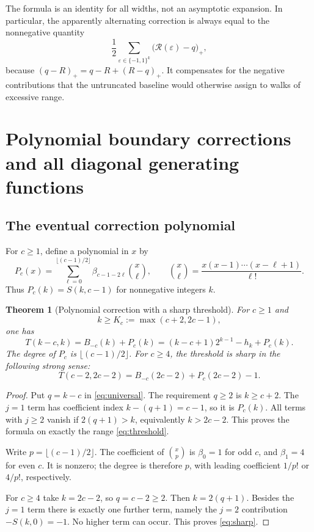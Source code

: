 \documentclass[11pt,letterpaper]{article}
\numberwithin{equation}{section}
\newtheorem{theorem}{Theorem}[section]
\theoremstyle{definition}
\begin{document}
The formula is an identity for all widths, not an asymptotic expansion.
In particular, the apparently alternating correction is always equal
to the nonnegative quantity
\begin{equation}\label{eq:overflow}
\frac12\sum_{\varepsilon\in\{-1,1\}^k}
\bigl(\mathcal R(\varepsilon)-q\bigr)_+,
\end{equation}
because $(q-R)_+=q-R+(R-q)_+$.  It compensates for the negative
contributions that the untruncated baseline would otherwise assign to
walks of excessive range.

\section{Polynomial boundary corrections and all diagonal generating functions}
\label{sec:diagonals}

\subsection{The eventual correction polynomial}
For $c\ge1$, define a polynomial in $x$ by
\begin{equation}\label{eq:Pc}
P_c(x)=\sum_{\ell=0}^{\lfloor(c-1)/2\rfloor}
\beta_{c-1-2\ell}\binom{x}{\ell},
\qquad
\binom{x}{\ell}=\frac{x(x-1)\cdots(x-\ell+1)}{\ell!}.
\end{equation}
Thus $P_c(k)=S(k,c-1)$ for nonnegative integers $k$.

\begin{theorem}[Polynomial correction with a sharp threshold]\label{thm:polynomial}
For $c\ge1$ and
\begin{equation}\label{eq:threshold}
k\ge K_c:=\max(c+2,2c-1),
\end{equation}
one has
\begin{equation}\label{eq:polynomial}
\boxed{\displaystyle
T(k-c,k)=B_{-c}(k)+P_c(k)
=(k-c+1)2^{k-1}-h_k+P_c(k).}
\end{equation}
The degree of $P_c$ is $\lfloor(c-1)/2\rfloor$.
For $c\ge4$, the threshold is sharp in the following strong sense:
\begin{equation}\label{eq:sharp}
T(c-2,2c-2)=B_{-c}(2c-2)+P_c(2c-2)-1.
\end{equation}
\end{theorem}
\begin{proof}
Put $q=k-c$ in \eqref{eq:universal}.  The requirement $q\ge2$ is
$k\ge c+2$.  The $j=1$ term has coefficient index
$k-(q+1)=c-1$, so it is $P_c(k)$.
All terms with $j\ge2$ vanish if
$2(q+1)>k$, equivalently $k>2c-2$.  This proves the formula on exactly
the range \eqref{eq:threshold}.

Write $p=\lfloor(c-1)/2\rfloor$.  The coefficient of
$\binom{x}{p}$ is $\beta_0=1$ for odd $c$, and $\beta_1=4$ for even $c$.
It is nonzero; the degree is therefore $p$, with leading coefficient
$1/p!$ or $4/p!$, respectively.

For $c\ge4$ take $k=2c-2$, so $q=c-2\ge2$.
Then $k=2(q+1)$.  Besides the $j=1$ term there is exactly one further
term, namely the $j=2$ contribution $-S(k,0)=-1$.
No higher term can occur.  This proves \eqref{eq:sharp}.
\end{proof}
\end{document}
